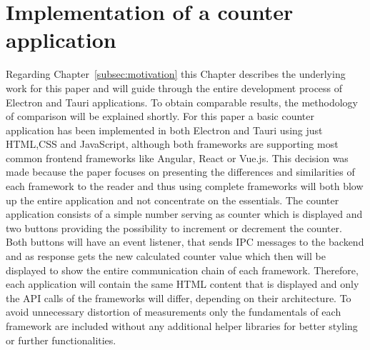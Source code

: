 \section{Implementation of a counter \\ application}
\label{sec:implementation}
Regarding Chapter~\ref{subsec:motivation} this Chapter describes the underlying work for this paper and will guide through the entire development process of Electron and Tauri applications.
To obtain comparable results, the methodology of comparison will be explained shortly.
For this paper a basic counter application has been implemented in both Electron and Tauri using just \ac{HTML},\ac{CSS} and JavaScript, although both frameworks are supporting most common frontend frameworks like Angular, React or Vue.js.
This decision was made because the paper focuses on presenting the differences and similarities of each framework to the reader and thus using complete frameworks will both blow up the entire application and not concentrate on the essentials.
The counter application consists of a simple number serving as counter which is displayed and two buttons providing the possibility to increment or decrement the counter.
Both buttons will have an event listener, that sends \ac{IPC} messages to the backend and as response gets the new calculated counter value which then will be displayed to show the entire communication chain of each framework.
Therefore, each application will contain the same \ac{HTML} content that is displayed and only the \ac{API} calls of the frameworks will differ, depending on their architecture.
To avoid unnecessary distortion of measurements only the fundamentals of each framework are included without any additional helper libraries for better styling or further functionalities.


